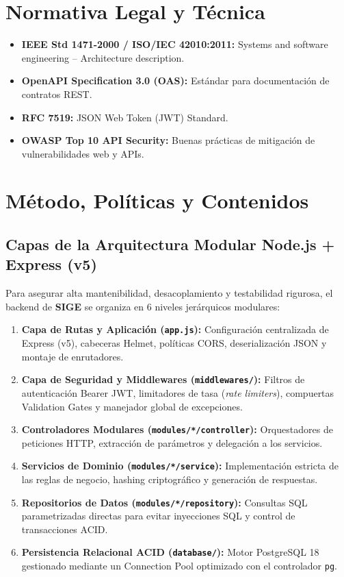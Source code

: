 \documentclass[11pt,a4paper]{article}
\begin{document}
\section{Normativa Legal y Técnica}
\begin{itemize}[leftmargin=1.5em, itemsep=2pt]
    \item \textbf{IEEE Std 1471-2000 / ISO/IEC 42010:2011:} Systems and software engineering -- Architecture description.
    \item \textbf{OpenAPI Specification 3.0 (OAS):} Estándar para documentación de contratos REST.
    \item \textbf{RFC 7519:} JSON Web Token (JWT) Standard.
    \item \textbf{OWASP Top 10 API Security:} Buenas prácticas de mitigación de vulnerabilidades web y APIs.
\end{itemize}

\section{Método, Políticas y Contenidos}

\subsection{Capas de la Arquitectura Modular Node.js + Express (v5)}
Para asegurar alta mantenibilidad, desacoplamiento y testabilidad rigurosa, el backend de \textbf{SIGE} se organiza en 6 niveles jerárquicos modulares:
\begin{enumerate}[leftmargin=1.5em, itemsep=2pt]
    \item \textbf{Capa de Rutas y Aplicación (\texttt{app.js}):} Configuración centralizada de Express (v5), cabeceras Helmet, políticas CORS, deserialización JSON y montaje de enrutadores.
    \item \textbf{Capa de Seguridad y Middlewares (\texttt{middlewares/}):} Filtros de autenticación Bearer JWT, limitadores de tasa (\textit{rate limiters}), compuertas Validation Gates y manejador global de excepciones.
    \item \textbf{Controladores Modulares (\texttt{modules/*/controller}):} Orquestadores de peticiones HTTP, extracción de parámetros y delegación a los servicios.
    \item \textbf{Servicios de Dominio (\texttt{modules/*/service}):} Implementación estricta de las reglas de negocio, hashing criptográfico y generación de respuestas.
    \item \textbf{Repositorios de Datos (\texttt{modules/*/repository}):} Consultas SQL parametrizadas directas para evitar inyecciones SQL y control de transacciones ACID.
    \item \textbf{Persistencia Relacional ACID (\texttt{database/}):} Motor PostgreSQL 18 gestionado mediante un Connection Pool optimizado con el controlador \texttt{pg}.
\end{enumerate}
\end{document}

